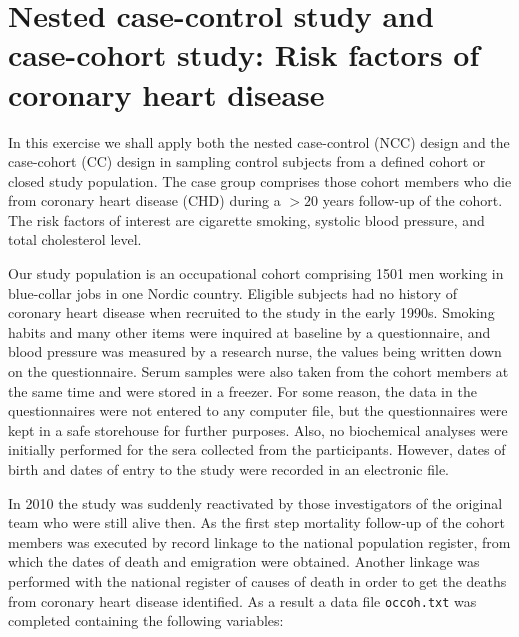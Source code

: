 \documentclass[
]{book}
\begin{document}
\chapter{Nested case-control study and case-cohort study: Risk factors of coronary heart disease}\label{nested-case-control-study-and-case-cohort-study-risk-factors-of-coronary-heart-disease}

In this exercise we shall apply both the nested case-control (NCC)
design and the case-cohort (CC) design in sampling
control subjects from a defined cohort or closed study population.
The case group comprises those cohort members who die from coronary heart disease (CHD) during a \(> 20\) years follow-up of the cohort.\\
The risk factors of interest are cigarette smoking, systolic blood pressure, and total cholesterol level.

Our study population is an occupational cohort comprising 1501 men
working in blue-collar jobs in one Nordic country.
Eligible subjects had no history of coronary heart disease
when recruited to the study in the early 1990s.
Smoking habits and many other items were inquired at baseline
by a questionnaire, and
blood pressure was measured by a research nurse, the values being
written down on the questionnaire. Serum samples were also taken from the cohort members at the same time and were stored in a freezer. For some reason,
the data in the questionnaires were not entered to any computer file, but the questionnaires were kept in a safe storehouse for further purposes.
Also, no biochemical analyses were initially performed for the sera
collected from the participants. However, dates of birth and dates of entry to the study were recorded
in an electronic file.

In 2010 the study was suddenly reactivated by those investigators of the original team who were still alive then.
As the first step mortality follow-up of the cohort members was
executed by record linkage to the national population register, from which
the dates of death and emigration were obtained. Another linkage was performed with the national register of causes of death in order to get the
deaths from coronary heart disease identified. As a result a data file
\texttt{occoh.txt} was completed containing the following variables:
\end{document}
